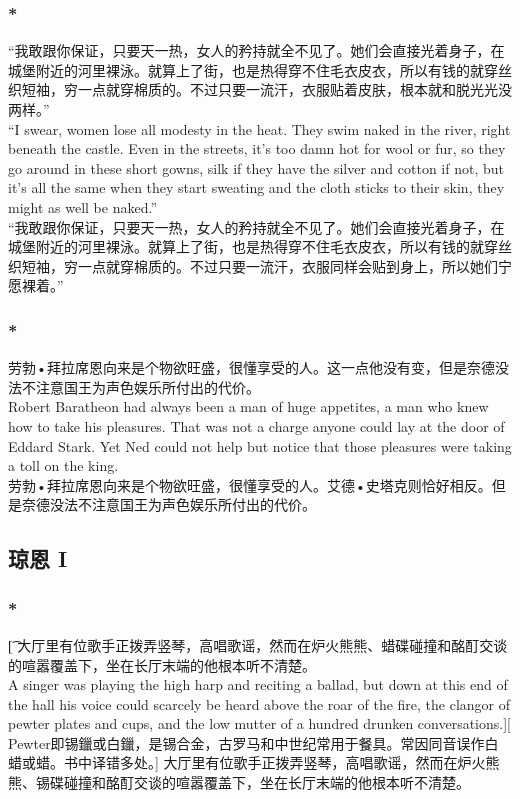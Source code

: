 \documentclass[12pt,a4paper]{article}
\newcommand{\la}[1]{{\color{blue}#1}\\}
\begin{document}
\subsubsection{\color{red}*}
\la{“我敢跟你保证，只要天一热，女人的矜持就全不见了。她们会直接光着身子，在城堡附近的河里裸泳。就算上了街，也是热得穿不住毛衣皮衣，所以有钱的就穿丝织短袖，穷一点就穿棉质的。不过只要一流汗，衣服贴着皮肤，根本就和脱光光没两样。”\\
	“I swear, women lose all modesty in the heat. They swim naked in the river, right beneath the castle. Even in the streets, it's too damn hot for wool or fur, so they go around in these short gowns, silk if they have the silver and cotton if not, but it's all the same when they start sweating and the cloth sticks to their skin, they might as well be naked.”}
“我敢跟你保证，只要天一热，女人的矜持就全不见了。她们会直接光着身子，在城堡附近的河里裸泳。就算上了街，也是热得穿不住毛衣皮衣，所以有钱的就穿丝织短袖，穷一点就穿棉质的。不过只要一流汗，衣服同样会贴到身上，所以她们宁愿裸着。”

\subsubsection{\color{red}*}
\la{劳勃•拜拉席恩向来是个物欲旺盛，很懂享受的人。这一点他没有变，但是奈德没法不注意国王为声色娱乐所付出的代价。\\
Robert Baratheon had always been a man of huge appetites, a man who knew how to take his pleasures. That was not a charge anyone could lay at the door of Eddard Stark. Yet Ned could not help but notice that those pleasures were taking a toll on the king.}
劳勃•拜拉席恩向来是个物欲旺盛，很懂享受的人。艾德•史塔克则恰好相反。但是奈德没法不注意国王为声色娱乐所付出的代价。


\subsection{琼恩 I}

\subsubsection{\color{red}*}\t[
	大厅里有位歌手正拨弄竖琴，高唱歌谣，然而在炉火熊熊、蜡碟碰撞和酩酊交谈的喧嚣覆盖下，坐在长厅末端的他根本听不清楚。\\
	A singer was playing the high harp and reciting a ballad, but down at this end of the hall his voice could scarcely be heard above the roar of the fire, the clangor of pewter plates and cups, and the low mutter of a hundred drunken conversations.][
	Pewter即锡鑞或白鑞，是锡合金，古罗马和中世纪常用于餐具。常因同音误作白蜡或蜡。书中译错多处。]
	大厅里有位歌手正拨弄竖琴，高唱歌谣，然而在炉火熊熊、锡碟碰撞和酩酊交谈的喧嚣覆盖下，坐在长厅末端的他根本听不清楚。
\end{document}

